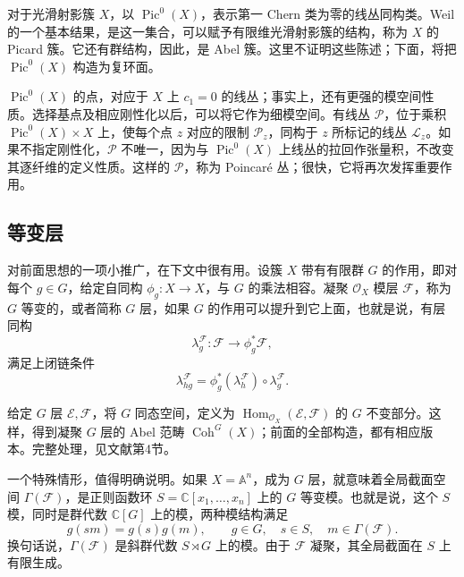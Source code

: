 对于光滑射影簇 $X$，以 $\operatorname{Pic}^0(X)$，表示第一 Chern 类为零的线丛同构类。Weil 的一个基本结果，是这一集合，可以赋予有限维光滑射影簇的结构，称为 $X$ 的 Picard 簇。它还有群结构，因此，是 Abel 簇。这里不证明这些陈述；下面，将把 $\operatorname{Pic}^0(X)$ 构造为复环面。

$\operatorname{Pic}^0(X)$ 的点，对应于 $X$ 上 $c_1=0$ 的线丛；事实上，还有更强的模空间性质。选择基点及相应刚性化以后，可以将它作为细模空间。有线丛 $\mathcal{P}$，位于乘积 $\operatorname{Pic}^0(X)\times X$ 上，使每个点 $z$ 对应的限制 $\mathcal{P}_z$，同构于 $z$ 所标记的线丛 $\mathcal{L}_z$。如果不指定刚性化，$\mathcal{P}$ 不唯一，因为与 $\operatorname{Pic}^0(X)$ 上线丛的拉回作张量积，不改变其逐纤维的定义性质。这样的 $\mathcal{P}$，称为 Poincar\'e 丛；很快，它将再次发挥重要作用。

\subsection{等变层}\label{sec:4.3.6}

对前面思想的一项小推广，在下文中很有用。设簇 $X$ 带有有限群 $G$ 的作用，即对每个 $g\in G$，给定自同构 $\phi_g\colon X\to X$，与 $G$ 的乘法相容。凝聚 $\mathcal{O}_X$ 模层 $\mathcal{F}$，称为 $G$ 等变的，或者简称 $G$ 层，如果 $G$ 的作用可以提升到它上面，也就是说，有层同构
\[
\lambda_g^{\mathcal{F}}\colon\mathcal{F}\longrightarrow\phi_g^*\mathcal{F},
\]
满足上闭链条件
\[
\lambda_{hg}^{\mathcal{F}}
=\phi_g^*(\lambda_h^{\mathcal{F}})\circ\lambda_g^{\mathcal{F}}.
\]

给定 $G$ 层 $\mathcal{E},\mathcal{F}$，将 $G$ 同态空间，定义为 $\operatorname{Hom}_{\mathcal{O}_X}(\mathcal{E},\mathcal{F})$ 的 $G$ 不变部分。这样，得到凝聚 $G$ 层的 Abel 范畴 $\operatorname{Coh}^G(X)$；前面的全部构造，都有相应版本。完整处理，见文献第4节。

一个特殊情形，值得明确说明。如果 $X=\mathbb{A}^n$，成为 $G$ 层，就意味着全局截面空间 $\Gamma(\mathcal{F})$，是正则函数环 $S=\mathbb{C}[x_1,\ldots,x_n]$ 上的 $G$ 等变模。也就是说，这个 $S$ 模，同时是群代数 $\mathbb{C}[G]$ 上的模，两种模结构满足
\[
g(sm)=g(s)g(m),\qquad
g\in G,\quad s\in S,\quad m\in\Gamma(\mathcal{F}).
\]
换句话说，$\Gamma(\mathcal{F})$ 是斜群代数 $S\rtimes G$ 上的模。由于 $\mathcal{F}$ 凝聚，其全局截面在 $S$ 上有限生成。


